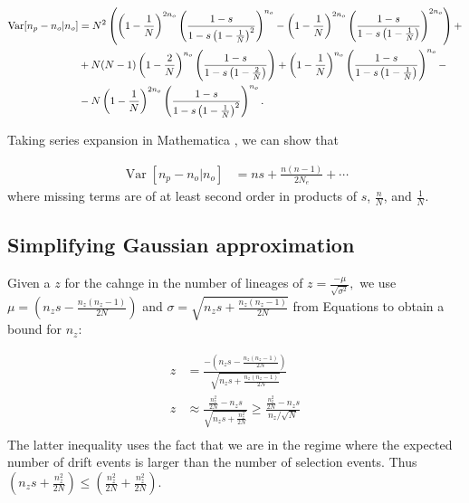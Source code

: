 \documentclass[review]{elsarticle}
\newcommand{\sgcomment}[1]{{\color{red}{SG: #1}}}
\begin{document}
\begin{equation}
  \begin{aligned}
    \operatorname{Var}[n_p-n_o | n_o] &=
    N^2\left( \left(1-\frac{1}{N}\right)^{2n_o}\left(\frac{1-s}{1-s \left(1-\frac{1}{N}\right)^2}\right)^{n_o}-\left(1-\frac{1}{N}\right)^{2n_o}\left(\frac{1-s}{1-s \left(1-\frac{1}{N}\right)}\right)^{2n_o} \right) + \\
    &+ N(N-1)\left(1-\frac{2}{N}\right)^{n_o}\left(\frac{1-s}{1-s \left(1-\frac{2}{N}\right)}\right) + \left(1-\frac{1}{N}\right)^{n_o}\left(\frac{1-s}{1-s \left(1-\frac{1}{N}\right)}\right)^{n_o} - \\
    &- N\left(1-\frac{1}{N}\right)^{2n_o} \left(\frac{1-s}{1-s \left(1-\frac{1}{N}\right)^{2}}\right)^{n_o}.
    \label{eq_exact_var}
  \end{aligned}
\end{equation}

Taking series expansion in Mathematica \sgcomment{it would be nice to give the command here}, we can show that  

\begin{equation}
  \begin{aligned}
    \operatorname{Var}[n_p-n_o | n_o] &= n s + \frac{n (n-1)}{2 N_e}  + \cdots
    \label{eq_exact_var}
  \end{aligned}
\end{equation}
where missing terms are of at least second order in products of  $s$, $\frac{n}{N}$,  and $\frac{1}{N}.$

\subsection{Simplifying Gaussian approximation}
\label{subsec_apx_gauss}
Given a $z$ for the cahnge in the number of lineages of $ z = \frac{-\mu}{\sqrt{\sigma^2}},$ 
we use $\mu=\left(  n_zs - \frac{n_z(n_z-1)}{2N} \right)$ and $\sigma = \sqrt{n_zs + \frac{n_z(n_z-1)}{2N}}$ from Equations \sgcomment{\eqref{}} to obtain a bound for $n_z$: 


\begin{equation}
\begin{aligned}
  z &= \frac{-\left(  n_zs - \frac{n_z(n_z-1)}{2N} \right)}	{\sqrt{n_zs + \frac{n_z(n_z-1)}{2N}}} \\
  z &\approx \frac{\frac{n_z^2}{2N} - n_z s}	{\sqrt{n_zs + \frac{n_z^2}{2N}}} \geq \frac{\frac{n_z^2}{2N} - n_z s}{n_z / \sqrt{N}} \\
 \end{aligned}
\end{equation}
 The latter inequality uses the fact that we are in the regime where the expected number of drift events is larger than the number of 
 selection events. Thus $\left(n_zs +
\frac{n_z^2}{2N} \right) \leq \left(\frac{n_z^2}{2N} + \frac{n_z^2}{2N} \right)$.
 
\end{document}
